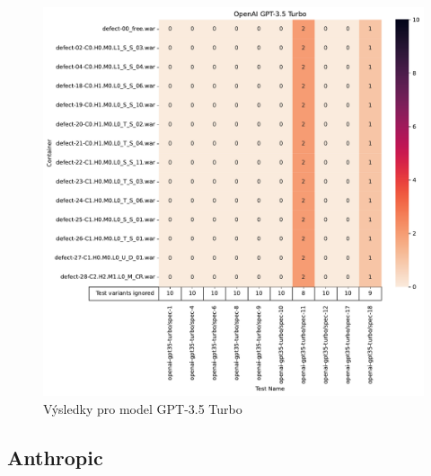 \documentclass[czech, ma, kiv, he, iso690alph, pdf, viewonly]{fasthesis}
\begin{document}
            \begin{figure}
                \includegraphics[width=\textwidth]{pic/gpt-3.5-turbo-results.pdf}
                \caption{Výsledky pro model GPT-3.5 Turbo}
                \label{fig:res:gpt-35-turbo}
            \end{figure}

        \subsection{Anthropic}
\end{document}
